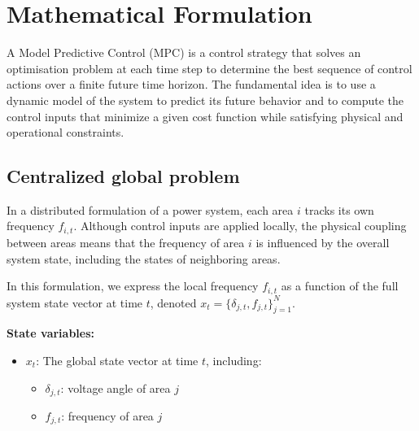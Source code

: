 \documentclass{article}
\begin{document}
\newpage
\section{Mathematical Formulation}
A Model Predictive Control (MPC) is a control strategy that solves an optimisation problem at each time step to determine the best sequence of control actions over a finite future time horizon. The fundamental idea is to use a dynamic model of the system to predict its future behavior and to compute the control inputs that minimize a given cost function while satisfying physical and operational constraints.

\subsection{Centralized global problem}

In a distributed formulation of a power system, each area $i$ tracks its own frequency $f_{i,t}$. Although control inputs are applied locally, the physical coupling between areas means that the frequency of area $i$ is influenced by the overall system state, including the states of neighboring areas.

In this formulation, we express the local frequency $f_{i,t}$ as a function of the full system state vector at time $t$, denoted $x_t = \{ \delta_{j,t}, f_{j,t} \}_{j=1}^{N}$.

\textbf{State variables:}
\begin{itemize}
    \item $x_t$: The global state vector at time $t$, including:
    \begin{itemize}
        \item $\delta_{j,t}$: voltage angle of area $j$
        \item $f_{j,t}$: frequency of area $j$
    \end{itemize}
\end{itemize}
\end{document}
